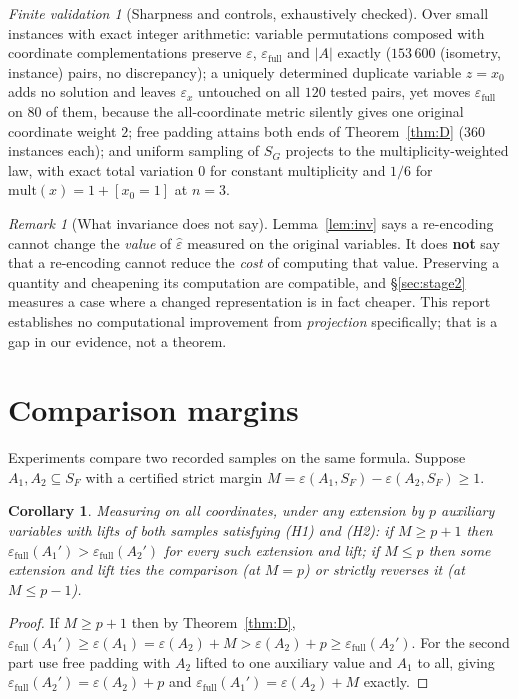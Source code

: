 \documentclass[11pt,a4paper]{article}
\theoremstyle{plain}
\newtheorem{corollary}[theorem]{Corollary}
\theoremstyle{definition}
\theoremstyle{remark}
\newtheorem{remark}[theorem]{Remark}
\newtheorem{observation}[theorem]{Finite validation}
\newcommand{\epshat}{\hat{\varepsilon}}
\newcommand{\SF}{S_F}
\begin{document}
\begin{observation}[Sharpness and controls, exhaustively checked]\label{obs:controls}
Over small instances with exact integer arithmetic: variable permutations
composed with coordinate complementations preserve $\varepsilon$,
$\varepsilon_{\mathrm{full}}$ and $|A|$ exactly ($153\,600$ (isometry, instance)
pairs, no discrepancy); a uniquely determined duplicate variable $z = x_0$ adds
no solution and leaves $\varepsilon_x$ untouched on all $120$ tested pairs, yet
moves $\varepsilon_{\mathrm{full}}$ on $80$ of them, because the all-coordinate
metric silently gives one original coordinate weight $2$; free padding attains
both ends of Theorem~\ref{thm:D} ($360$ instances each); and uniform sampling of
$S_G$ projects to the multiplicity-weighted law, with exact total variation $0$
for constant multiplicity and $1/6$ for $\mathrm{mult}(x)=1+[x_0{=}1]$ at $n=3$.
\end{observation}

\begin{remark}[What invariance does not say]\label{rem:cost}
Lemma~\ref{lem:inv} says a re-encoding cannot change the \emph{value} of
$\epshat$ measured on the original variables. It does \textbf{not} say that a
re-encoding cannot reduce the \emph{cost} of computing that value. Preserving a
quantity and cheapening its computation are compatible, and
\S\ref{sec:stage2} measures a case where a changed representation is in fact
cheaper. This report establishes no computational improvement from
\emph{projection} specifically; that is a gap in our evidence, not a theorem.
\end{remark}

\section{Comparison margins}\label{sec:margins}

Experiments compare two recorded samples on the same formula. Suppose
$A_1, A_2 \subseteq \SF$ with a certified strict margin
$M = \varepsilon(A_1,\SF) - \varepsilon(A_2,\SF) \ge 1$.

\begin{corollary}\label{cor:D1}
Measuring on all coordinates, under any extension by $p$ auxiliary variables
with lifts of both samples satisfying \textup{(H1)} and \textup{(H2)}:
if $M \ge p+1$ then
$\varepsilon_{\mathrm{full}}(A_1') > \varepsilon_{\mathrm{full}}(A_2')$ for
\emph{every} such extension and lift; if $M \le p$ then \emph{some} extension
and lift ties the comparison \textup{(}at $M = p$\textup{)} or strictly reverses
it \textup{(}at $M \le p-1$\textup{)}.
\end{corollary}
\begin{proof}
If $M \ge p+1$ then by Theorem~\ref{thm:D},
$\varepsilon_{\mathrm{full}}(A_1') \ge \varepsilon(A_1)
 = \varepsilon(A_2) + M > \varepsilon(A_2) + p
 \ge \varepsilon_{\mathrm{full}}(A_2')$.
For the second part use free padding with $A_2$ lifted to one auxiliary value
and $A_1$ to all, giving $\varepsilon_{\mathrm{full}}(A_2') = \varepsilon(A_2)+p$
and $\varepsilon_{\mathrm{full}}(A_1') = \varepsilon(A_2)+M$ exactly.
\end{proof}
\end{document}

